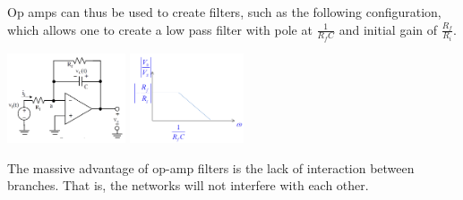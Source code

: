 \documentclass[nobib]{tufte-handout}
\begin{document}
Op amps can thus be used to create filters, such as the following configuration, which allows one to create a low pass filter with pole at $\frac{1}{R_fC}$ and initial gain of $\frac{R_f}{R_i}$.
\begin{center}
    \includegraphics[height = 100px]{images/opamplowpass.png}
    \includegraphics[height = 100px]{images/opamplowpassbode.png}
\end{center}
The massive advantage of op-amp filters is the lack of interaction between branches. That is, the networks will not interfere with each other.
\end{document}
